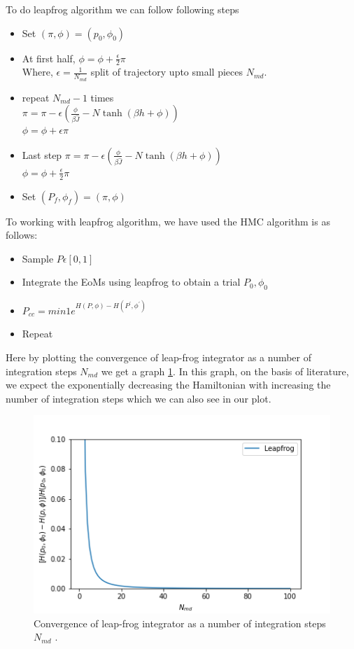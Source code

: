 \documentclass[11pt, a4paper, DIV=12]{scrartcl}
\begin{document}
To do leapfrog algorithm we can follow following steps
\begin{itemize}
	\item Set $(\pi, \phi) = (p_{0}, \phi_{0}) $
	\item At first half, $\phi=\phi +\frac{\epsilon}{2} \pi $\\
	Where, $ \epsilon=\frac{1}{N_{md}} $ split of trajectory upto small pieces $ N_{md} $.
	\item  repeat $ N_{md} - 1$ times\\
	$ \pi=\pi -\epsilon(\frac{\phi}{\beta \hat{J}} - N \tanh (\beta h + \phi)) $\\
	$\phi=\phi +\epsilon \pi $
	\item Last step $ \pi=\pi -\epsilon(\frac{\phi}{\beta \hat{J}} - N \tanh (\beta h + \phi)) $\\
	$\phi=\phi +\frac{\epsilon}{2}\pi $
\item	Set $(P_{f}, \phi_{f}) = (\pi, \phi) $
\end{itemize}
To working with leapfrog algorithm, we have used the HMC algorithm is as follows:
\begin{itemize}
	\item Sample $ P \epsilon[0,1] $
	\item Integrate the EoMs using leapfrog to obtain a trial $ P_{0}, \phi_{0} $
	\item $P_{cc} =min{1 e^{H(P, \phi)- H(P^{\prime}, \phi^{\prime})}} $
	\item Repeat
\end{itemize}
Here by plotting the convergence of leap-frog integrator as a number of integration steps $ N_{md}$ we get a graph \ref{fig:convergence}. In this graph, on the basis of literature, we expect the exponentially decreasing the Hamiltonian with increasing the number of integration steps which we can also see in our plot.
\begin{figure}[H]
	\centering
	\includegraphics[width=0.8\linewidth]{convergence.png}
	\caption{Convergence of leap-frog integrator as a number of integration steps $ N_{md}$  .}
	\label{fig:convergence}
\end{figure}
\end{document}
